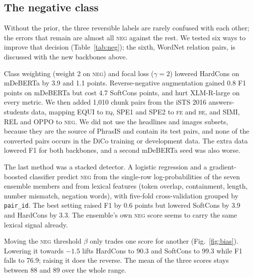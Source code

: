 \documentclass[conference]{IEEEtran}
\newcommand{\EQ}{\textsc{eq}}
\newcommand{\FE}{\textsc{fe}}
\newcommand{\BE}{\textsc{be}}
\newcommand{\NEG}{\textsc{neg}}
\begin{document}
\subsection{The negative class}
Without the prior, the three reversible labels are rarely confused with each
other; the errors that remain are almost all \NEG{} against the rest. We tested
six ways to improve that decision (Table~\ref{tab:neg}); the sixth, WordNet
relation pairs, is discussed with the new backbones above.

Class weighting (weight 2 on \NEG) and focal loss ($\gamma=2$) lowered HardCons
on mDeBERTa by 3.9 and 1.1 points. Reverse-negative augmentation gained 0.8 F1
points on mDeBERTa but cost 4.7 SoftCons points, and hurt XLM-R-large on every
metric. We then added 1{,}010 chunk pairs from the iSTS 2016
answers-students data, mapping EQUI to \EQ, SPE1 and SPE2 to \FE{} and \BE, and
SIMI, REL and OPPO to \NEG. We did not use the headlines and images subsets,
because they are the source of PhrasIS and contain its test pairs, and none of
the converted pairs occurs in the DiCo training or development data. The extra
data lowered F1 for both backbones, and a second mDeBERTa seed was also
worse.

The last method was a stacked detector. A logistic regression and a
gradient-boosted classifier predict \NEG{} from the single-row log-probabilities
of the seven ensemble members and from lexical features (token overlap,
containment, length, number mismatch, negation words), with five-fold
cross-validation grouped by \texttt{pair\_id}. The best setting raised F1 by
0.6 points but lowered SoftCons by 3.9 and HardCons by 3.3. The ensemble's own
\NEG{} score seems to carry the same lexical signal already.

Moving the \NEG{} threshold $\beta$ only trades one score for another
(Fig.~\ref{fig:bias}). Lowering it towards $-1.5$ lifts HardCons to 90.3 and
SoftCons to 99.3 while F1 falls to 76.9; raising it does the reverse. The mean
of the three scores stays between 88 and 89 over the whole range.
\end{document}

